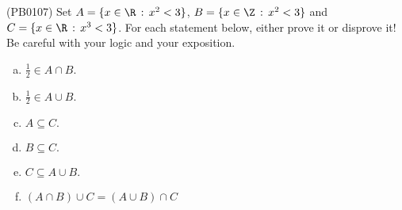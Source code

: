 (PB0107) Set $A=\{x\in\R\,:\,x^2<3\}$, $B=\{x\in\Z\,:\,x^2<3\}$ and $C=\{x\in\R\,:\,x^3<3\}$. For each statement below, either prove it or disprove it! Be careful with your logic and your exposition.
\begin{multicols}{2}
\begin{enumerate}[(a)]
\item $\frac{1}{2}\in A\cap B.$
\item $\frac{1}{2}\in A\cup B.$
\item $A\subseteq C.$
\item $B\subseteq C.$
\item $C\subseteq A\cup B.$
\item $(A\cap B)\cup C=(A\cup B)\cap C$
\end{enumerate}
\end{multicols}
